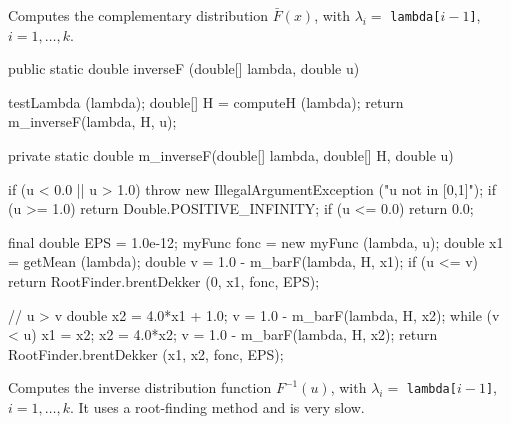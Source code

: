 \begin{tabb}
  Computes the complementary distribution $\bar F(x)$,
with $\lambda_i = $ \texttt{lambda[$i-1$]}, $i = 1,\ldots,k$.
 \end{tabb}
\begin{htmlonly}
\end{htmlonly}
\begin{code}

   public static double inverseF (double[] lambda, double u)\begin{hide} {
      testLambda (lambda);
		double[] H = computeH (lambda);
      return m_inverseF(lambda, H, u);
   }

   private static double m_inverseF(double[] lambda, double[] H, double u) {
      if (u < 0.0 || u > 1.0)
          throw new IllegalArgumentException ("u not in [0,1]");
      if (u >= 1.0)
          return Double.POSITIVE_INFINITY;
      if (u <= 0.0)
          return 0.0;

      final double EPS = 1.0e-12;
      myFunc fonc = new myFunc (lambda, u);
      double x1 = getMean (lambda);
      double v = 1.0 - m_barF(lambda, H, x1);
      if (u <= v)
         return RootFinder.brentDekker (0, x1, fonc, EPS);

      // u > v
      double x2 = 4.0*x1 + 1.0;
      v = 1.0 - m_barF(lambda, H, x2);
      while (v < u) {
         x1 = x2;
         x2 = 4.0*x2;
         v = 1.0 - m_barF(lambda, H, x2);
      }
      return RootFinder.brentDekker (x1, x2, fonc, EPS);
   }\end{hide}
\end{code}
\begin{tabb} Computes the inverse distribution function $F^{-1}(u)$,
with $\lambda_i = $ \texttt{lambda[$i-1$]}, $i = 1,\ldots,k$.
It uses a root-finding method and is very slow.
\end{tabb}
\begin{htmlonly}
\end{htmlonly}
\begin{code}\begin{hide}

   public void setLambda (double[] lambda) {
      super.setLambda (lambda);
      m_H = computeH (lambda);
   }

   public String toString() {
      StringBuilder sb = new StringBuilder();
      Formatter formatter = new Formatter(sb, Locale.US);
      formatter.format(getClass().getSimpleName() + " : lambda = {" +
           PrintfFormat.NEWLINE);
      int k = m_lambda.length;
      for(int i = 0; i < k; i++) {
         formatter.format("   %
      }
      formatter.format("}%
      return sb.toString();
   }
}\end{hide}
\end{code}
